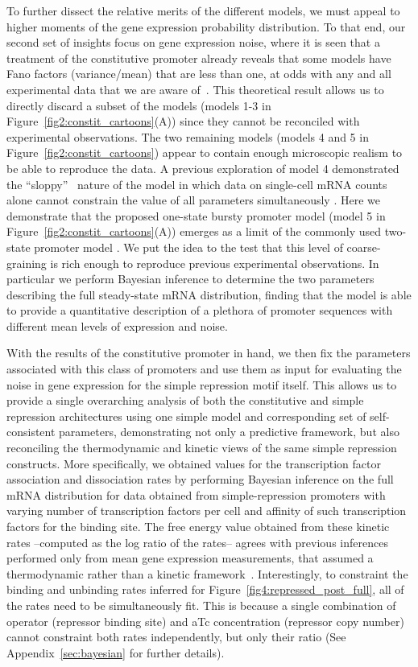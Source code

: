 To further dissect the relative merits of the different models, we must appeal
to higher moments of the gene expression probability distribution. To that end,
our second set of insights focus on gene expression noise, where it is seen that
a treatment of the constitutive promoter already reveals that some models have
Fano factors (variance/mean) that are less than one, at odds with any and all
experimental data that we are aware of~\cite{So2011, Jones2014}. This
theoretical result allows us to directly discard a subset of the models (models
1-3 in Figure~\ref{fig2:constit_cartoons}(A)) since they cannot be reconciled
with experimental observations. The two remaining models (models 4 and 5 in
Figure~\ref{fig2:constit_cartoons}) appear to contain enough microscopic realism
to be able to reproduce the data. A previous exploration of model 4 demonstrated
the ``sloppy''~\cite{Transtrum2015} nature of the model in which data on
single-cell mRNA counts alone cannot constrain the value of all parameters
simultaneously \cite{Razo-Mejia2020}. Here we demonstrate that the proposed
one-state bursty promoter model (model 5 in
Figure~\ref{fig2:constit_cartoons}(A)) emerges as a limit of the commonly used
two-state promoter model \cite{Peccoud1995, Shahrezaei2008, So2011, Sanchez2013,
Jones2014}. We put the idea to the test that this level of coarse-graining is
rich enough to reproduce previous experimental observations. In particular we
perform Bayesian inference to determine the two parameters describing the full
steady-state mRNA distribution, finding that the model is able to provide a
quantitative description of a plethora of promoter sequences with different mean
levels of expression and noise.

With the results of the constitutive promoter in hand, we then fix the
parameters associated with this class of promoters and use them as input for
evaluating the noise in gene expression for the simple repression motif itself.
This allows us to provide a single overarching analysis of both the constitutive
and simple repression architectures using one simple model and corresponding set
of self-consistent parameters, demonstrating not only a predictive framework,
but also reconciling the thermodynamic and kinetic views of the same simple
repression constructs. More specifically, we obtained values for the
transcription factor association and dissociation rates by performing Bayesian
inference on the full mRNA distribution for data obtained from simple-repression
promoters with varying number of transcription factors per cell and affinity of
such transcription factors for the binding site. The free energy value obtained
from these kinetic rates --computed as the log ratio of the rates-- agrees with
previous inferences performed only from mean gene expression measurements, that
assumed a thermodynamic rather than a kinetic
framework~\cite{Garcia2011a,Razo-Mejia2018}. Interestingly, to constraint the
binding and unbinding rates inferred for Figure~\ref{fig4:repressed_post_full},
all of the rates need to be simultaneously fit. This is because a single
combination of operator (repressor binding site) and aTc concentration
(repressor copy number) cannot constraint both rates independently, but only
their ratio (See Appendix~\ref{sec:bayesian} for further details).

